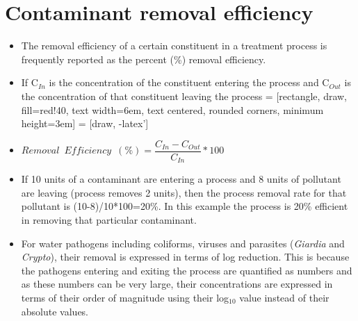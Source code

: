 \section{Contaminant removal efficiency}
\begin{itemize}
\item The removal efficiency of a certain constituent in a treatment process is frequently reported as the percent (\%) removal efficiency.
\item If C$_{In}$ is the concentration of the constituent entering the process and C$_{Out}$ is the concentration of that constituent leaving the process
 = [rectangle, draw, fill=red!40, 
    text width=6em, text centered, rounded corners, minimum height=3em]
 = [draw, -latex']
\begin{figure}[!h]
\centering
{}
\end{figure}

\item $Removal \enspace Efficiency \enspace (\%) = \dfrac{C_{In}-C_{Out}}{ C_{In}}*100$\\

\item If 10 units of a contaminant are entering a process and 8 units of pollutant are leaving (process removes 2 units), then the process removal rate for that pollutant is (10-8)/10*100=20\%.  In this example the process is 20\% efficient in removing that particular contaminant.

\item For water pathogens including coliforms, viruses and parasites (\textit{Giardia} and \textit{ Crypto}), their removal is expressed in terms of log reduction.  This is because the pathogens entering and exiting the process are quantified as numbers and as these numbers can be very large, their concentrations are expressed in terms of their order of magnitude using their log$_{10}$ value instead of their absolute values.   


\end{itemize}
